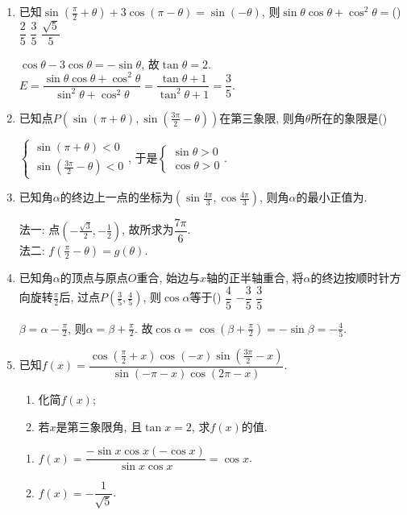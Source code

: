 \begin{enumerate}
\item 已知$\sin(\frac{\pi}{2}+\theta)+3\cos(\pi-\theta)=\sin(-\theta)$, 则$\sin\theta\cos\theta+\cos^2\theta=$\dotfill()
{$\dfrac{2}{5}$}
{$\dfrac{3}{5}$}
{$\dfrac{\sqrt5}{5}$}
\begin{jieda}
$\cos\theta-3\cos\theta=-\sin\theta$, 故$\tan\theta=2$. \\
$E=\dfrac{\sin\theta\cos\theta+\cos^2\theta}{\sin^2\theta+\cos^2\theta}=\dfrac{\tan\theta+1}{\tan^2\theta+1}=\dfrac{3}{5}$. 
\end{jieda}

\item 已知点$P(\sin(\pi+\theta),\sin(\frac{3\pi}{2}-\theta))$在第三象限, 则角$\theta$所在的象限是\dotfill()
\begin{jieda}
$\begin{cases}
\sin(\pi+\theta)<0\\
\sin(\frac{3\pi}{2}-\theta)<0
\end{cases}$, 
于是$\begin{cases}
\sin\theta>0\\
\cos\theta>0
\end{cases}$. 
\end{jieda}


\item 已知角$\alpha$的终边上一点的坐标为$(\sin\frac{4\pi}{3},\cos\frac{4\pi}{3})$, 则角$\alpha$的最小正值为.
\begin{jieda}
法一: 点$(-\frac{\sqrt{3}}{2},-\frac{1}{2})$, 故所求为$\dfrac{7\pi}{6}$. \\
法二: $f(\frac{\pi}{2}-\theta)=g(\theta)$. 
\end{jieda}

\item 已知角$\alpha$的顶点与原点$O$重合, 始边与$x$轴的正半轴重合, 将$\alpha$的终边按顺时针方向旋转$\frac{\pi}{2}$后, 
过点$P(\frac{3}{5},\frac{4}{5})$, 则$\cos\alpha$等于\dotfill()
{$\dfrac{4}{5}$}
{$-\dfrac{3}{5}$}
{$\dfrac{3}{5}$}
\begin{jieda}
$\beta=\alpha-\frac{\pi}{2}$, 则$\alpha=\beta+\frac{\pi}{2}$. 
故$\cos\alpha=\cos(\beta+\frac{\pi}{2})=-\sin\beta=-\frac{4}{5}$. 
\end{jieda}

\item 已知$f(x)=\dfrac{\cos(\frac{\pi}{2}+x)\cos(-x)\sin(\frac{3\pi}{2}-x)}{\sin(-\pi-x)\cos(2\pi-x)}$. 
\begin{enumerate}[(1)]
\item 化简$f(x)$; 
\item 若$x$是第三象限角, 且$\tan{x}=2$, 求$f(x)$的值. 
\end{enumerate}
\begin{jieda}
\begin{enumerate}[(1)]
\item $f(x)=\dfrac{-\sin{x}\cos{x}(-\cos{x})}{\sin{x}\cos{x}}=\cos{x}$. 
\item $f(x)=-\dfrac{1}{\sqrt{5}}$. 
\end{enumerate}
\end{jieda}


\end{enumerate}
